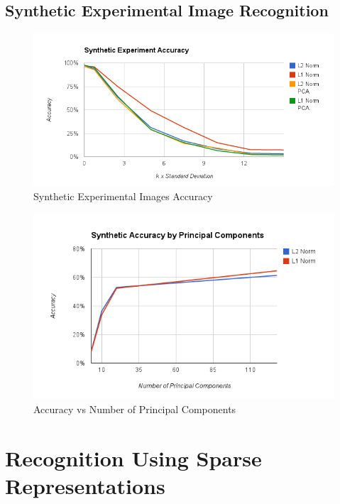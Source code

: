\documentclass[12pt,letterpaper]{article}
\begin{document}
\clearpage

\subsection{Synthetic Experimental Image Recognition}
\begin{figure}[ht]
  \begin{center}
    \includegraphics[scale=0.8]{figs/accuracy_with_pca.png}
    \caption{Synthetic Experimental Images Accuracy}
  \end{center}
\end{figure}

\begin{figure}[ht]
  \begin{center}
    \includegraphics[scale=0.8]{figs/accuracy_by_num_pc.png}
    \caption{Accuracy vs Number of Principal Components}
  \end{center}
\end{figure}
\clearpage

\section{Recognition Using Sparse Representations}
\end{document}
